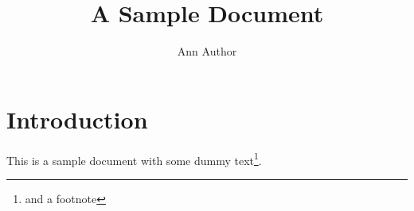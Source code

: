 \documentclass{scrreprt}
\title{A Sample Document}
\author{Ann Author}
\begin{document}
\maketitle
\tableofcontents

\chapter{Introduction}

This is a sample document with some dummy 
text\footnote{and a footnote}.
\lipsum
\end{document}
